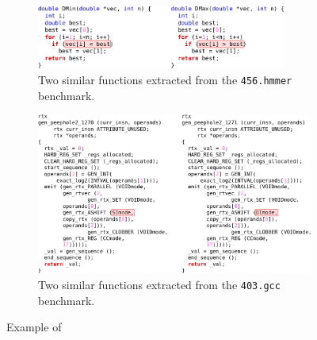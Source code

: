 \begin{figure}[h]
\centering
\begin{subfigure}{\textwidth}
\centering
\includegraphics[width=0.9\textwidth]{src/relatedwork/figs/example-similar-1-hmmer}
\caption{Two similar functions extracted from the \texttt{456.hmmer} benchmark.}
\label{fig:example-similar-1-hmmer}
\end{subfigure}
\begin{subfigure}{\textwidth}
\centering
\includegraphics[width=\textwidth]{src/relatedwork/figs/example-similar-3-gcc}
\caption{Two similar functions extracted from the \texttt{403.gcc} benchmark.}
\label{fig:example-similar-3-gcc}
\end{subfigure}
\caption{Example of }
\label{fig:example-similar}
\end{figure}

